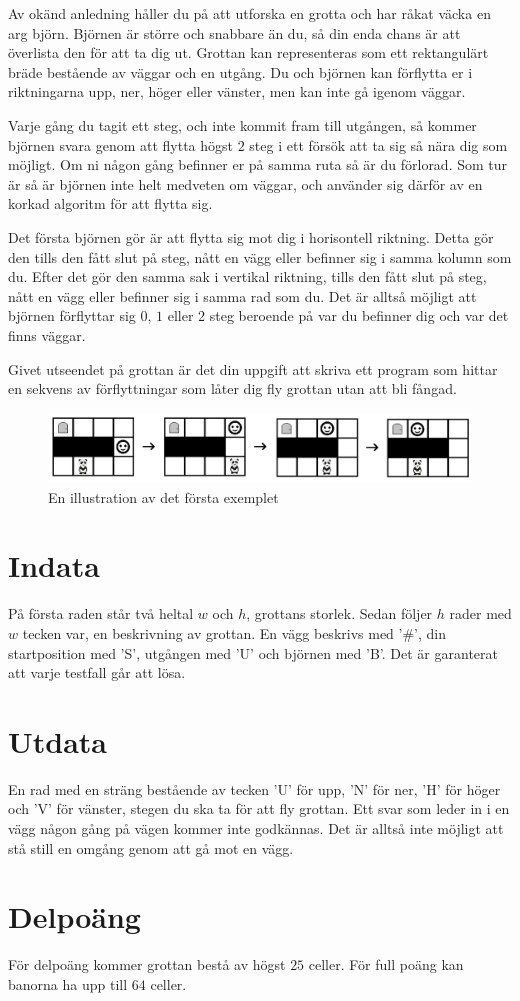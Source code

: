 Av okänd anledning håller du på att utforska en grotta och har råkat väcka en arg björn. Björnen är större och snabbare än du, så din enda chans är att överlista den för att ta dig ut. Grottan kan representeras som ett rektangulärt bräde bestående av väggar och en utgång. Du och björnen kan förflytta er i riktningarna upp, ner, höger eller vänster, men kan inte gå igenom väggar.

Varje gång du tagit ett steg, och inte kommit fram till utgången, så kommer björnen svara genom att flytta högst $2$ steg i ett försök att ta sig så nära dig som möjligt. Om ni någon gång befinner er på samma ruta så är du förlorad. Som tur är så är björnen inte helt medveten om väggar, och använder sig därför av en korkad algoritm för att flytta sig.

Det första björnen gör är att flytta sig mot dig i horisontell riktning. Detta gör den tills den fått slut på steg, nått en vägg eller befinner sig i samma kolumn som du. Efter det gör den samma sak i vertikal riktning, tills den fått slut på steg, nått en vägg eller befinner sig i samma rad som du. Det är alltså möjligt att björnen förflyttar sig $0$, $1$ eller $2$ steg beroende på var du befinner dig och var det finns väggar.

Givet utseendet på grottan är det din uppgift att skriva ett program som hittar en sekvens av förflyttningar som låter dig fly grottan utan att bli fångad.

\begin{figure}[ht!]
\centering
\includegraphics[width=\textwidth]{grottflykt.png}
\caption{En illustration av det första exemplet}
\label{overflow}
\end{figure}

\section*{Indata}
På första raden står två heltal $w$ och $h$, grottans storlek. Sedan följer $h$ rader med $w$ tecken var, en beskrivning av grottan. En vägg beskrivs med '\#', din startposition med 'S', utgången med 'U' och björnen med 'B'. Det är garanterat att varje testfall går att lösa. 
\section*{Utdata}
En rad med en sträng bestående av tecken 'U' för upp, 'N' för ner, 'H' för höger och 'V' för vänster, stegen du ska ta för att fly grottan. Ett svar som leder in i en vägg någon gång på vägen kommer inte godkännas. Det är alltså inte möjligt att stå still en omgång genom att gå mot en vägg.

\section*{Delpoäng}
För delpoäng kommer grottan bestå av högst $25$ celler. För full poäng kan banorna ha upp till $64$ celler.
